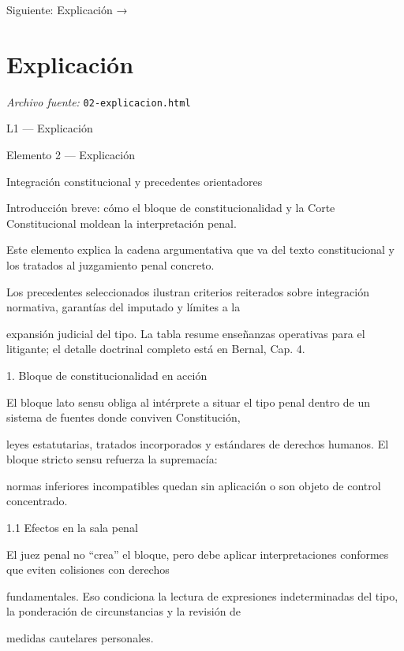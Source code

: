 \documentclass[11pt,a4paper]{article}
\begin{document}
    Siguiente: Explicación →\par

\section{Explicaci\'on}
\noindent\textit{Archivo fuente:} \texttt{02-explicacion.html}

L1 — Explicación\par





    Elemento 2 — Explicación\par
    Integración constitucional y precedentes orientadores\par

    Introducción breve: cómo el bloque de constitucionalidad y la Corte Constitucional moldean la interpretación penal.\par


      Este elemento explica la cadena argumentativa que va del texto constitucional y los tratados al juzgamiento penal concreto.\par
      Los precedentes seleccionados ilustran criterios reiterados sobre integración normativa, garantías del imputado y límites a la\par
      expansión judicial del tipo. La tabla resume enseñanzas operativas para el litigante; el detalle doctrinal completo está en Bernal, Cap. 4.\par



      1. Bloque de constitucionalidad en acción\par


        El bloque lato sensu obliga al intérprete a situar el tipo penal dentro de un sistema de fuentes donde conviven Constitución,\par
        leyes estatutarias, tratados incorporados y estándares de derechos humanos. El bloque stricto sensu refuerza la supremacía:\par
        normas inferiores incompatibles quedan sin aplicación o son objeto de control concentrado.\par



        1.1 Efectos en la sala penal\par

          El juez penal no “crea” el bloque, pero debe aplicar interpretaciones conformes que eviten colisiones con derechos\par
          fundamentales. Eso condiciona la lectura de expresiones indeterminadas del tipo, la ponderación de circunstancias y la revisión de\par
          medidas cautelares personales.\par
\end{document}
